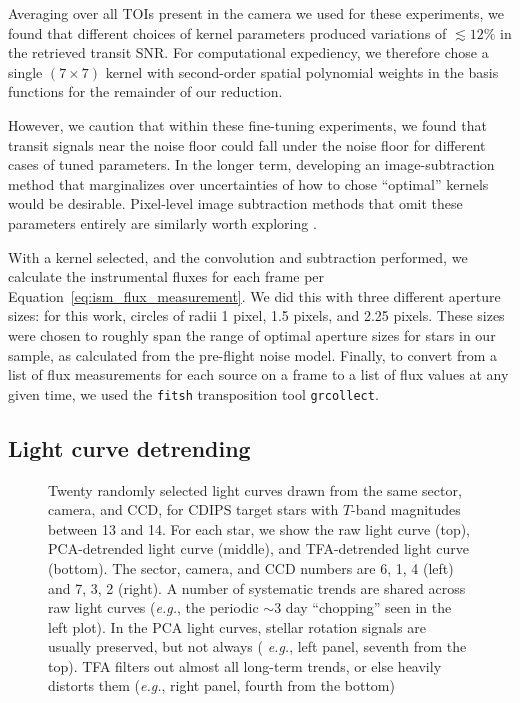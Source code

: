 \documentclass[12pt,twocolumn,tighten]{aastex62}
\begin{document}
Averaging over all TOIs present in the camera we used for these
experiments, we found that different choices of kernel parameters
produced variations of $\lesssim 12\%$ in the retrieved transit SNR.  
For computational expediency, we therefore chose a single $(7\times
7)$ kernel with second-order spatial polynomial weights in the basis
functions for the remainder of our reduction.

However, we caution that within these fine-tuning experiments, we
found that transit signals near the noise floor could fall under the
noise floor for different cases of tuned parameters.  In the longer
term, developing an image-subtraction method that marginalizes over
uncertainties of how to chose ``optimal'' kernels would be desirable.
Pixel-level image subtraction methods that omit these parameters
entirely are similarly worth exploring \citep{wang_pixel-level_2017}.

With a kernel selected, and the convolution and subtraction performed,
we calculate the instrumental fluxes for each frame per
Equation~\ref{eq:ism_flux_measurement}.  We did this with three
different aperture sizes: for this work, circles of radii 1 pixel, 1.5
pixels, and 2.25 pixels.  These sizes were chosen to roughly span the
range of optimal aperture sizes for stars in our sample, as calculated
from the pre-flight \citet{Sullivan_et_al_2015} noise model.  Finally,
to convert from a list of flux measurements for each source on a frame
to a list of flux values at any given time, we used the
\texttt{fitsh} transposition tool \texttt{grcollect}.

\subsection{Light curve detrending}
\label{subsec:lcdetrending}

\begin{figure}[!t]
	\vspace{-0.5cm}
	\caption{
    Twenty randomly selected light curves drawn from the same sector,
    camera, and CCD, for CDIPS target stars with $T$-band magnitudes
    between 13 and 14.  For each star, we show the raw light curve
    (top), PCA-detrended light curve (middle), and TFA-detrended light
    curve (bottom).  The sector, camera, and CCD numbers are 6, 1, 4
    (left) and 7, 3, 2 (right).  A number of systematic trends are
    shared across raw light curves ({\it e.g.}, the periodic $\sim$3 day
    ``chopping'' seen in the left plot).  In the PCA light curves,
    stellar rotation signals are usually preserved, but not always ({\it
    e.g.}, left panel, seventh from the top).  TFA filters out almost
    all long-term trends, or else heavily distorts them ({\it e.g.},
    right panel, fourth from the bottom)
	\label{fig:lc_systematics_dtr}
	}
\end{figure}
\end{document}
